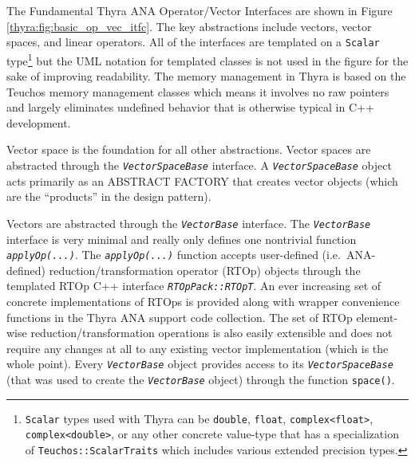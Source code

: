 \documentclass[11pt]{SANDreport}
\begin{document}
The Fundamental Thyra ANA Operator/Vector Interfaces are shown in Figure \ref{thyra:fig:basic_op_vec_itfc}. The key abstractions include vectors, vector spaces, and linear operators.  All of the interfaces are templated on a \texttt{Scalar} type\footnote{\texttt{Scalar} types used with Thyra can be \texttt{double}, \texttt{float}, \texttt{complex<float>}, \texttt{complex<double>}, or any other concrete value-type that has a specialization of \texttt{Teuchos\-::ScalarTraits} which includes various extended precision types.} but the UML notation for templated classes is not used in the figure for the sake of improving readability.  The memory management in Thyra is based on the Teuchos memory management classes \cite{TeuchosMMReport} which means it involves no raw pointers and largely eliminates undefined behavior that is otherwise typical in C++ development.

Vector space is the foundation for all other abstractions.  Vector spaces are abstracted through the \texttt{\textit{Vector\-Space\-Base}} interface.  A \texttt{\textit{Vector\-Space\-Base}} object acts primarily as an ABSTRACT FACTORY \cite{ref:gama_et_al_1995} that creates vector objects (which are the ``products'' in the design pattern).

Vectors are abstracted through the \texttt{\textit{Vector\-Base}} interface.  The \texttt{\textit{Vector\-Base}} interface is very minimal and really only defines one nontrivial function \texttt{\textit{applyOp(\-...)}}.  The \texttt{\textit{applyOp(\-...)}} function accepts user-defined (i.e.~ANA-defined) reduction/transformation operator (RTOp) objects through the templated RTOp C++ interface \texttt{\textit{RTOpPack::RTOpT}}.  An ever increasing set of concrete implementations of RTOps is provided along with wrapper convenience functions in the Thyra ANA support code collection.  The set of RTOp element-wise reduction/transformation operations is also easily extensible and does not require any changes at all to any existing vector implementation (which is the whole point).  Every \texttt{\textit{Vector\-Base}} object provides access to its \texttt{\textit{Vector\-Space\-Base}} (that was used to create the \texttt{\textit{Vector\-Base}} object) through the function \texttt{space()}.
\end{document}
